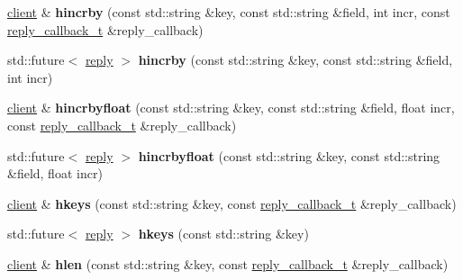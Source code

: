 \begin{DoxyCompactItemize}
\item 
\mbox{\label{classcpp__redis_1_1client_a517b6bdeb07edf20f5e57eb1b4942dd5}} 
\hyperlink{classcpp__redis_1_1client}{client} \& {\bfseries hincrby} (const std\+::string \&key, const std\+::string \&field, int incr, const \hyperlink{classcpp__redis_1_1client_a061a1140d36d2eaeda82b09a0bb3f9f2}{reply\+\_\+callback\+\_\+t} \&reply\+\_\+callback)
\item 
\mbox{\label{classcpp__redis_1_1client_aee1f9d8b1fe77bc5bed18000a9cf8b6f}} 
std\+::future$<$ \hyperlink{classcpp__redis_1_1reply}{reply} $>$ {\bfseries hincrby} (const std\+::string \&key, const std\+::string \&field, int incr)
\item 
\mbox{\label{classcpp__redis_1_1client_ade2a386b51e8bbd59cd7feef51bd0637}} 
\hyperlink{classcpp__redis_1_1client}{client} \& {\bfseries hincrbyfloat} (const std\+::string \&key, const std\+::string \&field, float incr, const \hyperlink{classcpp__redis_1_1client_a061a1140d36d2eaeda82b09a0bb3f9f2}{reply\+\_\+callback\+\_\+t} \&reply\+\_\+callback)
\item 
\mbox{\label{classcpp__redis_1_1client_a6b856272a5956b3b2839c5b5749c9b97}} 
std\+::future$<$ \hyperlink{classcpp__redis_1_1reply}{reply} $>$ {\bfseries hincrbyfloat} (const std\+::string \&key, const std\+::string \&field, float incr)
\item 
\mbox{\label{classcpp__redis_1_1client_a432f322ff1818fa65208725b1be7f4d2}} 
\hyperlink{classcpp__redis_1_1client}{client} \& {\bfseries hkeys} (const std\+::string \&key, const \hyperlink{classcpp__redis_1_1client_a061a1140d36d2eaeda82b09a0bb3f9f2}{reply\+\_\+callback\+\_\+t} \&reply\+\_\+callback)
\item 
\mbox{\label{classcpp__redis_1_1client_a578dade240f8fbbd6ba797bff9be18dd}} 
std\+::future$<$ \hyperlink{classcpp__redis_1_1reply}{reply} $>$ {\bfseries hkeys} (const std\+::string \&key)
\item 
\mbox{\label{classcpp__redis_1_1client_a88b88d74f77f2a59bc75b7d1fcdbd483}} 
\hyperlink{classcpp__redis_1_1client}{client} \& {\bfseries hlen} (const std\+::string \&key, const \hyperlink{classcpp__redis_1_1client_a061a1140d36d2eaeda82b09a0bb3f9f2}{reply\+\_\+callback\+\_\+t} \&reply\+\_\+callback)

\end{DoxyCompactItemize}
